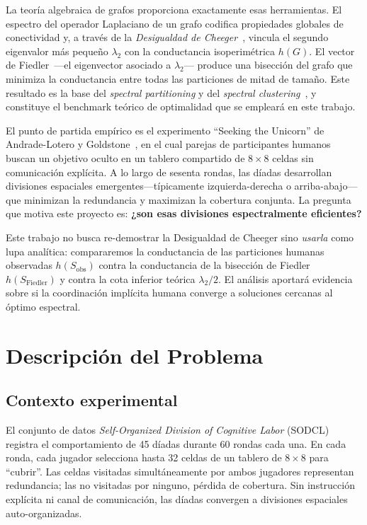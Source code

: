 \documentclass[journal]{IEEEtran}
\begin{document}
La teoría algebraica de grafos proporciona exactamente esas herramientas. El espectro
del operador Laplaciano de un grafo codifica propiedades globales de conectividad y,
a través de la \emph{Desigualdad de Cheeger}~\cite{chung1997,cheeger1970}, vincula el
segundo eigenvalor más pequeño $\lambda_2$ con la conductancia isoperimétrica $h(G)$.
El vector de Fiedler~\cite{fiedler1973}---el eigenvector asociado a $\lambda_2$---
produce una bisección del grafo que minimiza la conductancia entre todas las particiones
de mitad de tamaño. Este resultado es la base del \emph{spectral partitioning} y del
\emph{spectral clustering}~\cite{vonluxburg2007}, y constituye el benchmark teórico
de optimalidad que se empleará en este trabajo.

El punto de partida empírico es el experimento ``Seeking the Unicorn'' de
Andrade-Lotero y Goldstone~\cite{andrade2021}, en el cual parejas de participantes
humanos buscan un objetivo oculto en un tablero compartido de $8\times 8$ celdas sin
comunicación explícita. A lo largo de sesenta rondas, las díadas desarrollan divisiones
espaciales emergentes---típicamente izquierda-derecha o arriba-abajo---que minimizan la
redundancia y maximizan la cobertura conjunta. La pregunta que motiva este proyecto es:
\textbf{¿son esas divisiones espectralmente eficientes?}

Este trabajo no busca re-demostrar la Desigualdad de Cheeger sino \emph{usarla} como
lupa analítica: compararemos la conductancia de las particiones humanas observadas
$h(S_{\text{obs}})$ contra la conductancia de la bisección de Fiedler
$h(S_{\text{Fiedler}})$ y contra la cota inferior teórica $\lambda_2/2$. El análisis
aportará evidencia sobre si la coordinación implícita humana converge a soluciones
cercanas al óptimo espectral.


\section{Descripción del Problema}

\subsection{Contexto experimental}

El conjunto de datos \emph{Self-Organized Division of Cognitive Labor}
(SODCL)~\cite{andrade2021} registra el comportamiento de 45 díadas durante 60 rondas
cada una. En cada ronda, cada jugador selecciona hasta 32 celdas de un tablero de
$8\times 8$ para ``cubrir''. Las celdas visitadas simultáneamente por ambos jugadores
representan redundancia; las no visitadas por ninguno, pérdida de cobertura. Sin
instrucción explícita ni canal de comunicación, las díadas convergen a divisiones
espaciales auto-organizadas.
\end{document}
